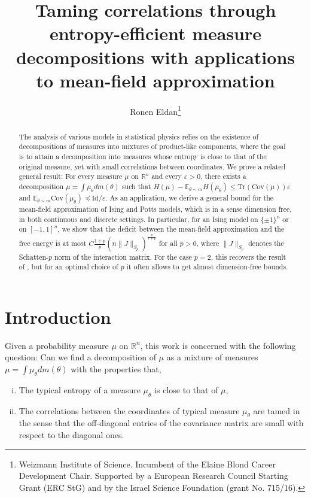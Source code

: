 \documentclass[12pt]{article}
\def \RR {\mathbb R}
\def \Tr {\mathrm{Tr}}
\def \EE {\mathbb E}
\def \Cov {\mathrm {Cov}}
\def \eps {\varepsilon}
\def \Id {\mathrm{Id}}
\def \Cov {\mathrm{Cov}}
\theoremstyle{definition}
\theoremstyle{remark}
\begin{document}
\title{\Large Taming correlations through entropy-efficient measure decompositions with applications to mean-field approximation}
\date{}
\author{Ronen Eldan\thanks{Weizmann Institute of Science. Incumbent of the Elaine Blond Career Development Chair. Supported by a European Research Council Starting Grant (ERC StG) and by the Israel Science Foundation (grant No. 715/16).}}
\maketitle
\begin{abstract}
The analysis of various models in statistical physics relies on the existence of decompositions of measures into mixtures of product-like components, where the goal is to attain a decomposition into measures whose entropy is close to that of the original measure, yet with small correlations between coordinates. We prove a related general result: For every measure $\mu$ on $\RR^n$ and every $\eps > 0$, there exists a decomposition $\mu = \int \mu_\theta d m(\theta)$ such that $H(\mu) - \EE_{\theta \sim m} H(\mu_\theta) \leq \Tr(\Cov(\mu)) \eps$ and $\EE_{\theta \sim m} \Cov(\mu_\theta) \preceq \Id/\eps$. As an application, we derive a general bound for the mean-field approximation of Ising and Potts models, which is in a sense dimension free, in both continuous and discrete settings. In particular, for an Ising model on $\{\pm 1 \}^n$ or on $[-1,1]^n$, we show that the deficit between the mean-field approximation and the free energy is at most $C \frac{1+p}{p} \left ( n\|J\|_{S_p} \right)^{\frac{p}{1+p}}  $ for all $p>0$, where $\|J\|_{S_p}$ denotes the Schatten-$p$ norm of the interaction matrix. For the case $p=2$, this recovers the result of \cite{JKR18}, but for an optimal choice of $p$ it often allows to get almost dimension-free bounds.
\end{abstract}

\section{Introduction}
Given a probability measure $\mu$ on $\RR^n$, this work is concerned with the following question: Can we find a decomposition of $\mu$ as a mixture of measures $\mu = \int \mu_\theta d m(\theta)$ with the properties that, 
\begin{enumerate}[(i)]
\item	
The typical entropy of a measure $\mu_\theta$ is close to that of $\mu$,
\item	
The correlations between the coordinates of typical measure $\mu_\theta$ are tamed in the sense that the off-diagonal entries of the covariance matrix are small with respect to the diagonal ones.
\end{enumerate}
\end{document}
